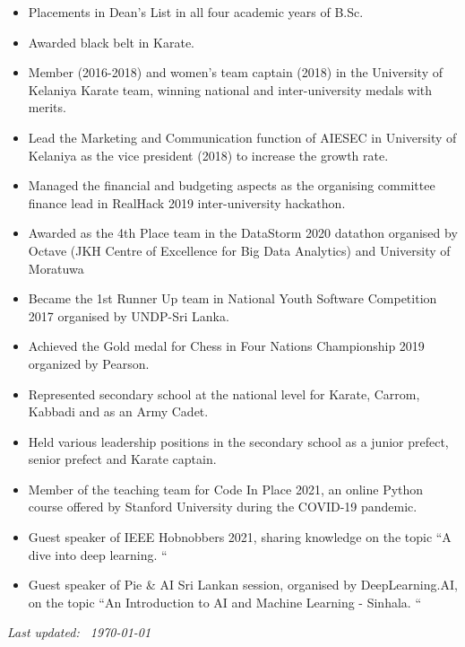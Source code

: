 \documentclass[10pt,a4paper,ragged2e,withhyper]{altacv}
\begin{document}
\medskip

\begin{itemize}
    \item Placements in Dean’s List in all four academic years of B.Sc.
    \item Awarded black belt in Karate.
    \item Member (2016-2018) and women's team captain (2018) in the University of Kelaniya Karate team, winning national and inter-university medals with merits. 
    \item Lead the Marketing and Communication function of AIESEC in University of Kelaniya as the vice president (2018) to increase the growth rate.
    \item Managed the financial and budgeting aspects as the organising committee finance lead in RealHack 2019 inter-university hackathon.
    \item Awarded as the 4th Place team in the DataStorm 2020 datathon organised by Octave (JKH Centre of Excellence for Big Data Analytics) and University of Moratuwa
    \item Became the 1st Runner Up team in National Youth Software Competition 2017 organised by UNDP-Sri Lanka.
    \item Achieved the Gold medal for Chess in Four Nations Championship 2019 organized by Pearson.
    \item Represented secondary school at the national level for Karate, Carrom, Kabbadi and as an Army Cadet.
    \item Held various leadership positions in the secondary school as a junior prefect, senior prefect and Karate captain.
\end{itemize}

\medskip

\begin{itemize}
    \item Member of the teaching team for Code In Place 2021, an online Python course offered by Stanford University during the COVID-19 pandemic. 
    \item Guest speaker of IEEE Hobnobbers 2021, sharing knowledge on the topic ``A dive into deep learning. ``
    \item Guest speaker of Pie \& AI Sri Lankan session, organised by DeepLearning.AI, on the topic ``An Introduction to AI and Machine Learning - Sinhala. ``
\end{itemize}

\medskip



\vfill
\begin{flushright}
\flushright
\footnotesize{\emph{Last updated: ~\today }}
\end{flushright}
\end{document}
